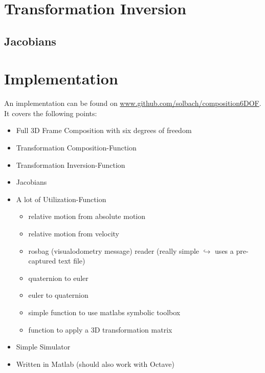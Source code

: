 \documentclass[10pt,a4paper]{scrartcl}
\begin{document}
\section{Transformation Inversion}
\subsection{Jacobians}

\section{Implementation}
An implementation can be found on \href{https://github.com/solbach/composition6DOF}{www.github.com/solbach/composition6DOF}. \\It covers the following points:
\begin{itemize}
\item Full 3D Frame Composition with six degrees of freedom
\item Transformation Composition-Function
\item Transformation Inversion-Function
\item Jacobians
\item A lot of Utilization-Function
\begin{itemize}
\item relative motion from absolute motion 
\item relative motion from velocity
\item rosbag (visualodometry message) reader (really simple $\hookrightarrow$ uses a pre-captured text file)
\item quaternion to euler
\item euler to quaternion
\item simple function to use matlabs symbolic toolbox
\item function to apply a 3D transformation matrix
\end{itemize}
\item Simple Simulator
\item Written in Matlab (should also work with Octave)
\end{itemize}

\end{document}
